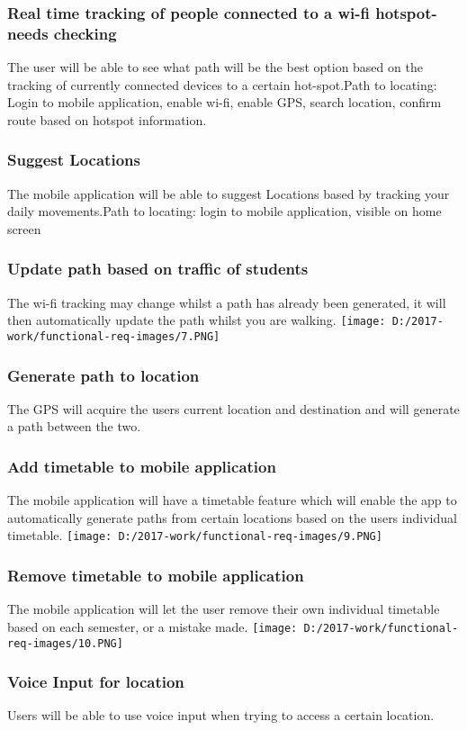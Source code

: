 \documentclass{article}
\begin{document}
\begin{center}
\subsubsection{Real time tracking of people connected to a wi-fi hotspot-needs checking}
The user will be able to see what path will be the best option based on the tracking of currently connected devices to a certain hot-spot.Path to locating: Login to mobile application, enable wi-fi, enable GPS, search location, confirm route based on hotspot information.
\newpage
\subsubsection{Suggest Locations}
The mobile application will be able to suggest Locations based by tracking your daily movements.Path to locating: login to mobile application, visible on home screen
\subsubsection{Update path based on traffic of students}
The wi-fi tracking may change whilst a path has already been generated, it will then automatically update the path whilst you are walking.
\texttt{[image: D:/2017-work/functional-req-images/7.PNG]}
\newpage
\subsubsection{Generate path to location}
The GPS will acquire the users current location and destination and will generate a path between the two.

\subsubsection{Add timetable to mobile application}
The mobile application will have a timetable feature which will enable the app to automatically generate paths from certain locations based on the users individual timetable. 
\texttt{[image: D:/2017-work/functional-req-images/9.PNG]}
\newpage
\subsubsection{Remove timetable to mobile application}
The mobile application will let the user remove their own individual timetable based on each semester, or a mistake made.
\texttt{[image: D:/2017-work/functional-req-images/10.PNG]}
\newpage
\subsubsection{Voice Input for location}
Users will be able to use voice input when trying to access a certain location.

\end{center}
\end{document}

